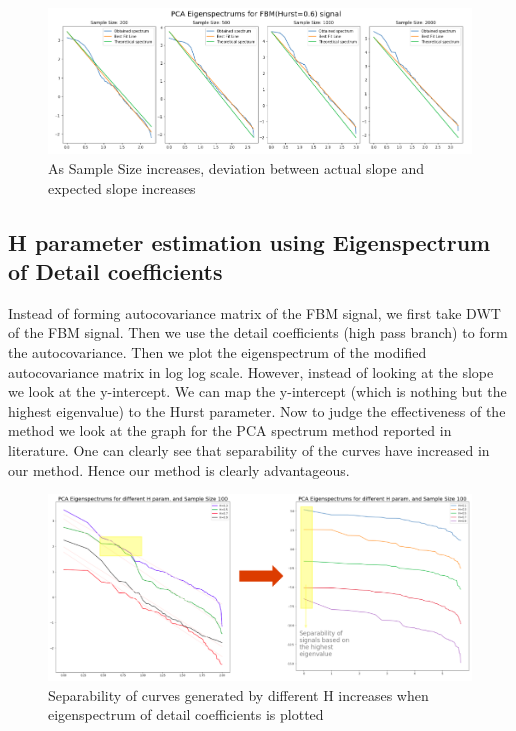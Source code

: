 \documentclass[a4paper]{article}
\begin{document}
\begin{figure}[h]
\includegraphics[width=\textwidth]{Li_2.png}
\caption{As Sample Size increases, deviation between actual slope and expected slope increases}
\end{figure}

\subsection{H parameter estimation using Eigenspectrum of Detail coefficients}
Instead of forming autocovariance matrix of the FBM signal, we first take DWT of the FBM signal. Then we use the detail coefficients (high pass branch) to form the autocovariance. Then we plot the eigenspectrum of the modified autocovariance matrix in log log scale. However, instead of looking at the slope we look at the y-intercept. We can map the y-intercept (which is nothing but the highest eigenvalue) to the Hurst parameter.
Now to judge the effectiveness of the method we look at the graph for the PCA spectrum method reported in literature. One can clearly see that separability of the curves have increased in our method. Hence our method is clearly advantageous.

\begin{figure}[H]
\includegraphics[width=\textwidth]{dwt_1.png}
\caption{Separability of curves generated by different H increases when eigenspectrum of detail coefficients is plotted}
\end{figure}
\end{document}
